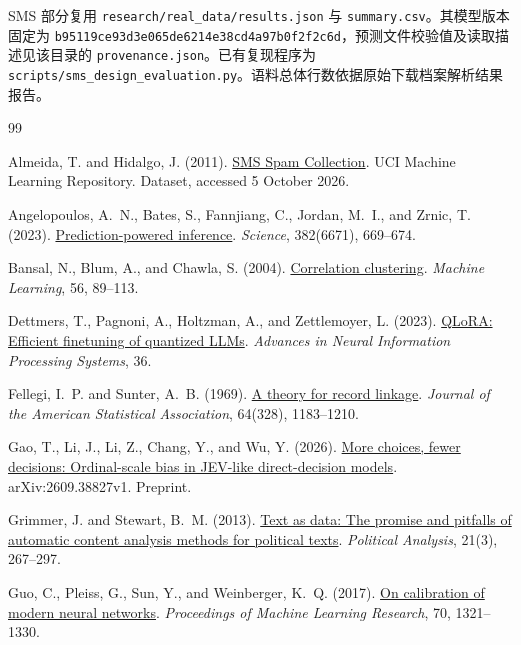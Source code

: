 \documentclass[UTF8,a4paper,zihao=-4,fontset=fandol]{ctexart}
\begin{document}
SMS 部分复用 \nolinkurl{research/real_data/results.json} 与 \nolinkurl{summary.csv}。其模型版本固定为 \nolinkurl{b95119ce93d3e065de6214e38cd4a97b0f2f2c6d}，预测文件校验值及读取描述见该目录的 \nolinkurl{provenance.json}。已有复现程序为 \nolinkurl{scripts/sms_design_evaluation.py}。语料总体行数依据原始下载档案解析结果报告。
\begin{thebibliography}{99}
\small
{}

Almeida, T. and Hidalgo, J. (2011).
\href{https://doi.org/10.24432/C5CC84}{SMS Spam Collection}.
UCI Machine Learning Repository. Dataset, accessed 5 October 2026.

Angelopoulos, A.~N., Bates, S., Fannjiang, C., Jordan, M.~I., and Zrnic, T. (2023).
\href{https://doi.org/10.1126/science.adi6000}{Prediction-powered inference}.
\emph{Science}, 382(6671), 669--674.

Bansal, N., Blum, A., and Chawla, S. (2004).
\href{https://doi.org/10.1023/B:MACH.0000033116.57574.95}{Correlation clustering}.
\emph{Machine Learning}, 56, 89--113.

Dettmers, T., Pagnoni, A., Holtzman, A., and Zettlemoyer, L. (2023).
\href{https://proceedings.neurips.cc/paper_files/paper/2023/hash/1feb87871436031bdc0f2beaa62a049b-Abstract-Conference.html}{QLoRA: Efficient finetuning of quantized LLMs}.
\emph{Advances in Neural Information Processing Systems}, 36.

Fellegi, I.~P. and Sunter, A.~B. (1969).
\href{https://doi.org/10.1080/01621459.1969.10501049}{A theory for record linkage}.
\emph{Journal of the American Statistical Association}, 64(328), 1183--1210.

Gao, T., Li, J., Li, Z., Chang, Y., and Wu, Y. (2026).
\href{https://arxiv.org/abs/2609.38827v1}{More choices, fewer decisions: Ordinal-scale bias in JEV-like direct-decision models}.
arXiv:2609.38827v1. Preprint.

Grimmer, J. and Stewart, B.~M. (2013).
\href{https://doi.org/10.1093/pan/mps028}{Text as data: The promise and pitfalls of automatic content analysis methods for political texts}.
\emph{Political Analysis}, 21(3), 267--297.

Guo, C., Pleiss, G., Sun, Y., and Weinberger, K.~Q. (2017).
\href{https://proceedings.mlr.press/v70/guo17a.html}{On calibration of modern neural networks}.
\emph{Proceedings of Machine Learning Research}, 70, 1321--1330.


\end{thebibliography}
\end{document}
